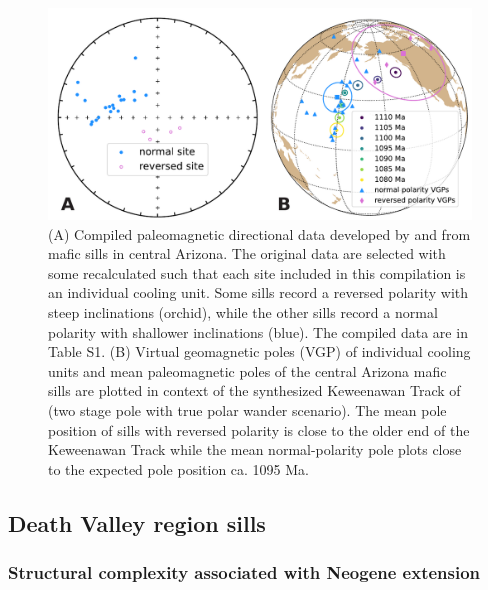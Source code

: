 \documentclass[draft]{agujournal2019}
\begin{document}
\begin{figure}[h!]
\centering
\includegraphics[width=\textwidth]{Harlan_Donadini_compilation.pdf}
\caption{(A) Compiled paleomagnetic directional data developed by  and  from mafic sills in central Arizona. The original data are selected with some recalculated such that each site included in this compilation is an individual cooling unit. Some sills record a reversed polarity with steep inclinations (orchid), while the other sills record a normal polarity with shallower inclinations (blue). The compiled data are in Table S1. (B) Virtual geomagnetic poles (VGP) of individual cooling units and mean paleomagnetic poles of the central Arizona mafic sills are plotted in context of the synthesized Keweenawan Track of  (two stage pole with true polar wander scenario). The mean pole position of sills with reversed polarity is close to the older end of the Keweenawan Track while the mean normal-polarity pole plots close to the expected pole position ca. 1095 Ma.}
\label{fig:Harlan_Donadini_compilation}
\end{figure}

\subsection*{Death Valley region sills}
\subsubsection*{Structural complexity associated with Neogene extension}
\end{document}
